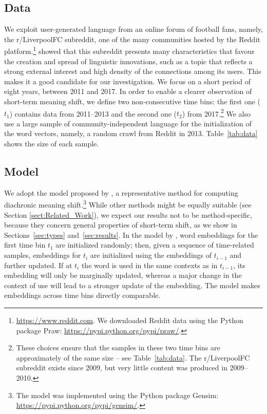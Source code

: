 \subsection{Data}
\label{subsec:Data}
We exploit user-generated language from an online forum of football fans,
namely, the r/LiverpoolFC subreddit, one of the many communities hosted
by the Reddit platform.\footnote{\url{https://www.reddit.com}. We downloaded Reddit data using the Python package Praw: \url{https://pypi.python.org/pypi/praw/}.}
 showed that this subreddit presents many characteristics that favour the creation and spread of linguistic innovations, such as a topic that reflects a strong external interest and high density of the connections among its users. This makes it a good candidate for our investigation.
We focus on a short period of eight years, between 2011 and 2017. 
In order to enable a clearer observation of short-term meaning shift, we define two
non-consecutive time bins: the first one ($t_1$) contains data from
2011--2013 and the second one ($t_2$) from 2017.\footnote{These choices
  ensure that the samples in these two time bins are approximately of the same size -- see Table~\ref{tab:data}. The
  r/LiverpoolFC subreddit exists since 2009, but very little content
  was produced in 2009--2010.}
 We also use a large sample of community-independent language for the
initialization of the word vectors, namely, a random crawl from Reddit
in 2013.
Table~\ref{tab:data} shows the size of each sample.

\subsection{Model}
\label{subsec:Model}
We adopt the model proposed by , a representative method for computing diachronic meaning shift.\footnote{The model was implemented using the Python package Gensim: \url{https://pypi.python.org/pypi/gensim/}.} While other methods might be equally suitable (see Section \ref{sect:Related_Work}), we expect our results not to be method-specific, because they concern general properties of short-term shift, as we show in Sections~\ref{sec:types} and~\ref{sec:results}.
In the model by , word
embeddings for the first time bin $t_1$ are initialized randomly; then,
given a sequence of time-related samples, embeddings for $t_i$
are initialized using the embeddings of $t_{i-1}$ and further
updated. 
If at $t_i$ the word is used in the same contexts as in $t_{i-1}$, its embedding will only be marginally updated, whereas a major change in the context of use will lead to a stronger update of the embedding. The model makes embeddings across time bins directly comparable.

